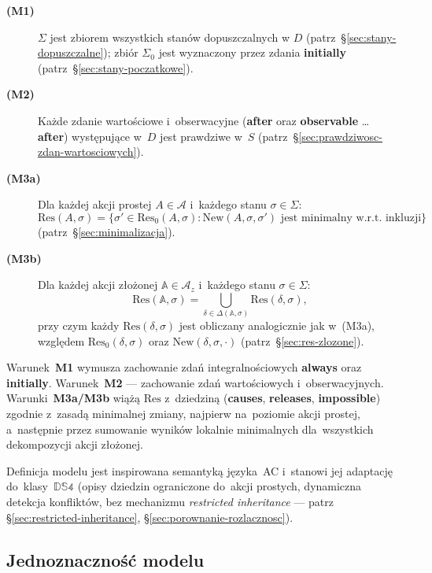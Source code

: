 \documentclass[11pt,a4paper]{article}
\newif\ifshowbib
\newcommand{\bibonly}[1]{\ifshowbib#1\fi}
\renewcommand{\cite}[2][]{\unskip}%
\newcommand{\causes}{\textbf{causes}}
\newcommand{\aft}{\textbf{after}}
\newcommand{\initially}{\textbf{initially}}
\newcommand{\always}{\textbf{always}}
\newcommand{\impossible}{\textbf{impossible}}
\newcommand{\releases}{\textbf{releases}}
\newcommand{\observable}{\textbf{observable}}
\theoremstyle{definition}
\begin{document}
\begin{description}
    \item[\textbf{(M1)}] $\Sigma$ jest zbiorem wszystkich stanów dopuszczalnych w $D$ (patrz~§\ref{sec:stany-dopuszczalne}); zbiór $\Sigma_0$ jest wyznaczony przez zdania \initially{} (patrz~§\ref{sec:stany-poczatkowe}).
    \item[\textbf{(M2)}] Każde zdanie wartościowe i~obserwacyjne (\aft{} oraz \observable{} \ldots{} \aft{}) występujące w~$D$ jest prawdziwe w~$S$ (patrz~§\ref{sec:prawdziwosc-zdan-wartosciowych}).
    \item[\textbf{(M3a)}] Dla każdej akcji prostej $A \in \mathcal{A}$ i~każdego stanu $\sigma \in \Sigma$:
          \[
            \mathrm{Res}(A, \sigma) = \{\sigma' \in \mathrm{Res}_0(A, \sigma) :
                \mathrm{New}(A, \sigma, \sigma')\text{ jest minimalny w.r.t.~inkluzji}\}
          \]
          (patrz~§\ref{sec:minimalizacja}).
    \item[\textbf{(M3b)}] Dla każdej akcji złożonej $\mathbb{A} \in \mathcal{A}_z$ i~każdego stanu $\sigma \in \Sigma$:
          \[
            \mathrm{Res}(\mathbb{A}, \sigma) = \bigcup_{\delta \in \Delta(\mathbb{A},\sigma)} \mathrm{Res}(\delta, \sigma),
          \]
          przy czym każdy $\mathrm{Res}(\delta,\sigma)$ jest obliczany analogicznie jak w~(M3a), względem $\mathrm{Res}_0(\delta,\sigma)$ oraz $\mathrm{New}(\delta,\sigma,\cdot)$ (patrz~§\ref{sec:res-zlozone}).
\end{description}

Warunek~\textbf{M1} wymusza zachowanie zdań integralnościowych \always{} oraz \initially{}. Warunek~\textbf{M2} --- zachowanie zdań wartościowych i~obserwacyjnych. Warunki~\textbf{M3a/M3b} wiążą $\mathrm{Res}$ z~dziedziną (\causes{}, \releases{}, \impossible{}) zgodnie z~zasadą minimalnej zmiany, najpierw na~poziomie akcji prostej, a~następnie przez sumowanie wyników lokalnie minimalnych dla~wszystkich dekompozycji akcji złożonej.

Definicja modelu jest inspirowana semantyką języka~AC\bibonly{~\cite{rw05}} i~stanowi jej adaptację do~klasy~$\mathbb{DS4}$ (opisy dziedzin ograniczone do~akcji prostych, dynamiczna detekcja konfliktów, bez mechanizmu \textit{restricted inheritance} --- patrz §\ref{sec:restricted-inheritance}, §\ref{sec:porownanie-rozlacznosc}).

\subsection{Jednoznaczność modelu}
\label{sec:jednoznacznosc-modelu}
\end{document}
